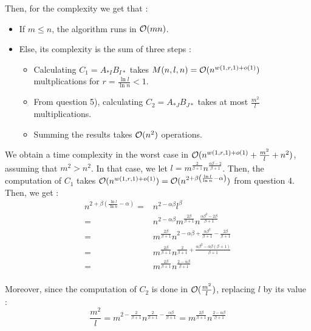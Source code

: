 \documentclass{cours}
\begin{document}
        Then, for the complexity we get that :
        \begin{itemize}
            \item If $m \leq n$, the algorithm runs in $\mathcal{O}(mn)$.
            \item Else, its complexity is the sum of three steps :
            \begin{itemize}
                \item Calculating $C_{1} = A_{*I}B_{I*}$ takes $M(n, l, n) = \mathcal{O}(n^{w(1, r, 1) + o(1)})$ multplications for $r = \frac{\ln l}{\ln n} < 1$.
                \item From question 5), calculating $C_{2} = A_{*J}B_{J*}$ takes at most $\frac{m^{2}}{l}$ multiplications. 
                \item Summing the results takes $\mathcal{O}(n^{2})$ operations.
            \end{itemize}
        \end{itemize}

        We obtain a time complexity in the worst case in $\mathcal{O}(n^{w(1, r, 1) + o(1)} + \frac{m^{2}}{l} + n^{2})$, assuming that $m^{2} > n^{2}$.
        In that case, we let $l = m^{\frac{2}{\beta + 1}}n^{\frac{\alpha\beta - 2}{\beta + 1}}$.
        Then, the computation of $C_{1}$ takes $\mathcal{O}(n^{w(1, r, 1) + o(1)}) = \mathcal{O}(n^{2 + \beta\left(\frac{\ln l}{\ln n} - \alpha\right)})$ from question 4. Then, we get : 
        \[
            \begin{aligned}
                n^{2 + \beta\left(\frac{\ln l}{\ln n} - \alpha\right)} =& n^{2 - \alpha\beta} l^{\beta} \\
                =& n^{2 - \alpha\beta}m^{\frac{2\beta}{\beta + 1}}n^{\frac{\alpha\beta^{2} - 2\beta}{\beta + 1}}\\
                =& m^{\frac{2\beta}{\beta + 1}}n^{2 - \alpha\beta + \frac{\alpha\beta^{2}}{\beta + 1} - \frac{2 \beta}{\beta + 1}}\\
                =& m^{\frac{2\beta}{\beta + 1}}n^{\frac{2}{\beta+1} + \frac{\alpha\beta^{2} - \alpha\beta\left(\beta + 1\right)}{\beta + 1}}\\
                =& m^{\frac{2\beta}{\beta + 1}}n^{\frac{2 - \alpha \beta}{\beta + 1}}\\
            \end{aligned}
        \]

        Moreover, since the computation of $C_{2}$ is done in $\mathcal{O}(\frac{m^{2}}{l})$, replacing $l$ by its value : 
        \[
            \frac{m^{2}}{l} = m^{2 - \frac{2}{\beta + 1}}n^{\frac{2}{\beta + 1} - \frac{\alpha \beta}{\beta + 1}} = m^{\frac{2\beta}{\beta + 1}}n^{\frac{2 - \alpha\beta}{\beta + 1}}
        \]
            
\end{document}
